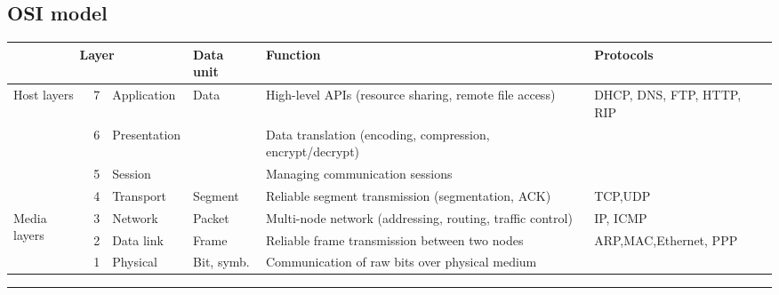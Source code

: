 \documentclass{form}
\begin{document}
\begin{minipage}{0.06\textwidth}
    \subsection*{OSI model}
\end{minipage}%
\begin{minipage}{0.93\textwidth}
    \begin{tabular}{@{}p{9mm} | l | l | l | l | l@{}}
        \multicolumn{3}{c|}{\textbf{Layer}}                    & Data unit                & Function                                                        & Protocols             \\ \hline
        \multirow{4}{9mm}{Host layers}      & 7 & Application  & \multirow{3}{*}{Data}    & High-level APIs (resource sharing, remote file access)          & DHCP, DNS, FTP, HTTP, RIP                      \\ \cline{2-3} \cline{5-6}
                                            & 6 & Presentation &                          & Data translation (encoding, compression, encrypt/decrypt)       &                       \\ \cline{2-3} \cline{5-6}
                                            & 5 & Session      &                          & Managing communication sessions                                 &                       \\ \cline{2-6}
                                            & 4 & Transport    & Segment                  & Reliable segment transmission (segmentation, ACK)               & TCP,UDP               \\ \hline
        \multirow{3}{9mm}{Media layers}     & 3 & Network      & Packet                   & Multi-node network (addressing, routing, traffic control)       & IP, ICMP              \\ \cline{2-6}
                                            & 2 & Data link    & Frame                    & Reliable frame transmission between two nodes                   & ARP,MAC,Ethernet, PPP \\ \cline{2-6}
                                            & 1 & Physical     & Bit, symb.               & Communication of raw bits over physical medium                  &                       \\
    \end{tabular}
\end{minipage}%

\vspace{0em}\rule{\textwidth}{1.0pt}\vspace{-0em}
\end{document}
